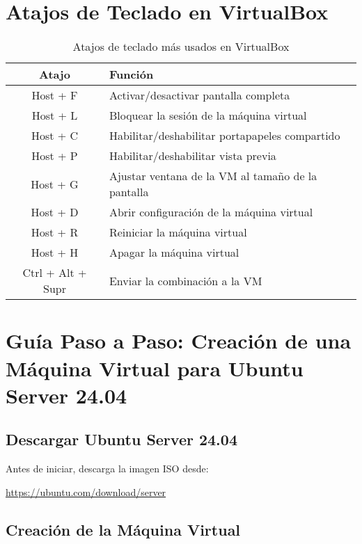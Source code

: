 \documentclass{article}
\begin{document}
\section{Atajos de Teclado en VirtualBox}

\begin{table}[h]
    \centering
    \begin{tabular}{|c|l|}
        \hline
        \textbf{Atajo} & \textbf{Función} \\
        \hline
        Host + F & Activar/desactivar pantalla completa \\
        Host + L & Bloquear la sesión de la máquina virtual \\
        Host + C & Habilitar/deshabilitar portapapeles compartido \\
        Host + P & Habilitar/deshabilitar vista previa \\
        Host + G & Ajustar ventana de la VM al tamaño de la pantalla \\
        Host + D & Abrir configuración de la máquina virtual \\
        Host + R & Reiniciar la máquina virtual \\
        Host + H & Apagar la máquina virtual \\
        Ctrl + Alt + Supr & Enviar la combinación a la VM \\
        \hline
    \end{tabular}
    \caption{Atajos de teclado más usados en VirtualBox}
    \label{tab:atajos}
\end{table}

\section{Guía Paso a Paso: Creación de una Máquina Virtual para Ubuntu Server 24.04}

\subsection{Descargar Ubuntu Server 24.04}
Antes de iniciar, descarga la imagen ISO desde:

\begin{center}
    \url{https://ubuntu.com/download/server}
\end{center}

\subsection{Creación de la Máquina Virtual}
\end{document}
